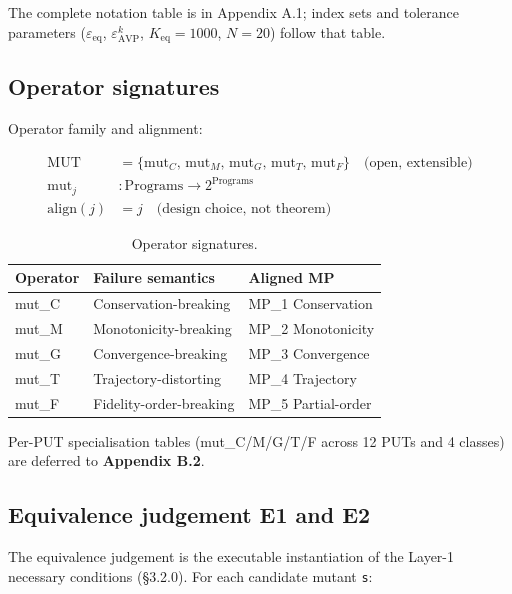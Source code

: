 \documentclass[acmsmall,screen,review]{acmart}
\begin{document}
The complete notation table is in Appendix A.1; index sets and tolerance
parameters ($\varepsilon_{\mathrm{eq}}$, $\varepsilon_{\mathrm{AVP}}^k$,
$K_{\mathrm{eq}} = 1000$, $N = 20$) follow that table.

\subsection{Operator signatures}\label{operator-signatures}

Operator family and alignment:

\begin{align*}
\mathrm{MUT} &= \{\mathrm{mut}_C,\, \mathrm{mut}_M,\, \mathrm{mut}_G,\, \mathrm{mut}_T,\, \mathrm{mut}_F\} \quad \text{(open, extensible)} \\
\mathrm{mut}_j &: \text{Programs} \to 2^{\text{Programs}} \\
\mathrm{align}(j) &= j \quad \text{(design choice, not theorem)}
\end{align*}

{\def\LTcaptype{table} %
\begin{longtable}[]{@{}lll@{}}
\caption{Operator signatures.}\label{tab:p2-01}\\
\toprule\noalign{}
Operator & Failure semantics & Aligned MP \\
\midrule\noalign{}
\endhead
\bottomrule\noalign{}
\endlastfoot
mut\_C & Conservation-breaking & MP\_1 Conservation \\
mut\_M & Monotonicity-breaking & MP\_2 Monotonicity \\
mut\_G & Convergence-breaking & MP\_3 Convergence \\
mut\_T & Trajectory-distorting & MP\_4 Trajectory \\
mut\_F & Fidelity-order-breaking & MP\_5 Partial-order \\
\end{longtable}
}

Per-PUT specialisation tables (mut\_C/M/G/T/F across 12 PUTs and 4
classes) are deferred to \textbf{Appendix B.2}.

\subsection{Equivalence judgement E1 and E2}\label{equivalence-judgement-e1-e2-layer-2}

The equivalence judgement is the executable instantiation of the Layer-1
necessary conditions (§3.2.0). For each candidate mutant
\texttt{s\textquotesingle{}}:
\end{document}

